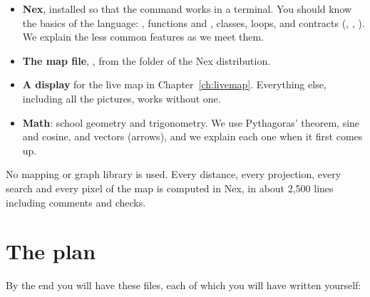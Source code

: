 \begin{itemize}[nosep]
  \item \textbf{Nex}, installed so that the  command works in a
        terminal. You should know the basics of the language: ,
        functions and , classes, loops, and contracts
        (, , ). We explain the
        less common features as we meet them.
  \item \textbf{The map file}, , from the
         folder of the Nex distribution.
  \item \textbf{A display} for the live map in Chapter~\ref{ch:livemap}.
        Everything else, including all the pictures, works without one.
  \item \textbf{Math}: school geometry and trigonometry. We use
        Pythagoras' theorem, sine and cosine, and vectors (arrows), and we
        explain each one when it first comes up.
\end{itemize}

No mapping or graph library is used. Every distance, every projection,
every search and every pixel of the map is computed in Nex, in about 2,500
lines including comments and checks.

\section{The plan}

By the end you will have these files, each of which you will have written
yourself:

